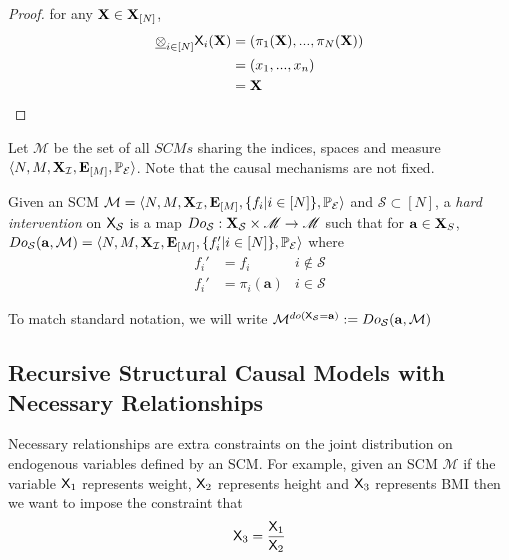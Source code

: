 \begin{proof}
for any $\mathbf{X}\in \mathbf{X}_{[N]}$,
\begin{align}
\underline{\otimes}_{i\in [N]} \mathsf{X}_i (\mathbf{X}) &= (\pi_1(\mathbf{X}),...,\pi_N(\mathbf{X}))\\
	&= (x_1,...,x_n)\\
	&= \mathbf{X}
\end{align}
\end{proof}

\begin{definition}
Let $\mathscr{M}$ be the set of all $SCMs$ sharing the indices, spaces and measure $\langle N,M,\mathbf{X}_{\mathcal{I}},\mathbf{E}_{[M]},\mathbb{P}_{\mathcal{E}}\rangle$. Note that the causal mechanisms are not fixed.

Given an SCM $\mathcal{M}=\langle N,M,\mathbf{X}_{\mathcal{I}},\mathbf{E}_{[M]},\{f_i|i\in[N]\},\mathbb{P}_{\mathcal{E}}\rangle$ and $\mathcal{S}\subset[N]$, a \emph{hard intervention} on $\mathsf{X}_\mathcal{S}$ is a map $Do_{\mathcal{S}}:\mathbf{X}_\mathcal{S}\times\mathscr{M}\to \mathscr{M}$ such that for $\mathbf{a}\in \mathbf{X}_S$, $Do_{\mathcal{S}}(\mathbf{a},\mathcal{M}) = \langle N,M,\mathbf{X}_{\mathcal{I}},\mathbf{E}_{[M]},\{f'_i|i\in[N]\},\mathbb{P}_{\mathcal{E}}\rangle$ where
\begin{align}
	f_i' &= f_i  &i\not\in \mathcal{S}\\
	f_i' &= \pi_i(\mathbf{a}) & i\in \mathcal{S}
\end{align}

To match standard notation, we will write $\mathcal{M}^{do(\mathsf{X}_\mathcal{S} = \mathbf{a})}:=Do_{\mathcal{S}}(\mathbf{a},\mathcal{M})$
\end{definition}

\subsection{Recursive Structural Causal Models with Necessary Relationships}

Necessary relationships are extra constraints on the joint distribution on endogenous variables defined by an SCM. For example, given an SCM $\mathcal{M}$ if the variable $\mathsf{X}_1$ represents weight, $\mathsf{X}_2$ represents height and $\mathsf{X}_3$ represents BMI then we want to impose the constraint that
\begin{align}
	\mathsf{X}_3 = \frac{\mathsf{X}_1}{\mathsf{X}_2}
\end{align}


